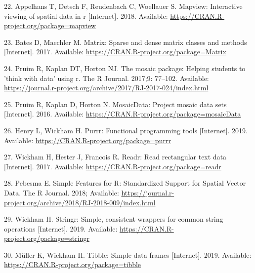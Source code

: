 \documentclass[10pt,letterpaper]{article}
\begin{document}
\hypertarget{ref-R-mapview}{}
22. Appelhans T, Detsch F, Reudenbach C, Woellauer S. Mapview:
Interactive viewing of spatial data in r {[}Internet{]}. 2018.
Available: \url{https://CRAN.R-project.org/package=mapview}

\hypertarget{ref-R-Matrix}{}
23. Bates D, Maechler M. Matrix: Sparse and dense matrix classes and
methods {[}Internet{]}. 2017. Available:
\url{https://CRAN.R-project.org/package=Matrix}

\hypertarget{ref-R-mosaic}{}
24. Pruim R, Kaplan DT, Horton NJ. The mosaic package: Helping students
to 'think with data' using r. The R Journal. 2017;9: 77--102. Available:
\url{https://journal.r-project.org/archive/2017/RJ-2017-024/index.html}

\hypertarget{ref-R-mosaicData}{}
25. Pruim R, Kaplan D, Horton N. MosaicData: Project mosaic data sets
{[}Internet{]}. 2016. Available:
\url{https://CRAN.R-project.org/package=mosaicData}

\hypertarget{ref-R-purrr}{}
26. Henry L, Wickham H. Purrr: Functional programming tools
{[}Internet{]}. 2019. Available:
\url{https://CRAN.R-project.org/package=purrr}

\hypertarget{ref-R-readr}{}
27. Wickham H, Hester J, Francois R. Readr: Read rectangular text data
{[}Internet{]}. 2017. Available:
\url{https://CRAN.R-project.org/package=readr}

\hypertarget{ref-R-sf}{}
28. Pebesma E. Simple Features for R: Standardized Support for Spatial
Vector Data. The R Journal. 2018; Available:
\url{https://journal.r-project.org/archive/2018/RJ-2018-009/index.html}

\hypertarget{ref-R-stringr}{}
29. Wickham H. Stringr: Simple, consistent wrappers for common string
operations {[}Internet{]}. 2019. Available:
\url{https://CRAN.R-project.org/package=stringr}

\hypertarget{ref-R-tibble}{}
30. Müller K, Wickham H. Tibble: Simple data frames {[}Internet{]}.
2019. Available: \url{https://CRAN.R-project.org/package=tibble}

\nolinenumbers
\end{document}
